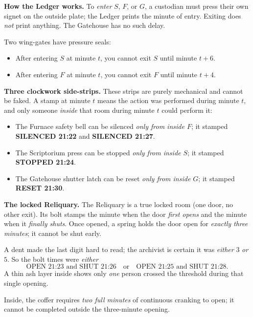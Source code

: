 \medskip

\noindent\textbf{How the Ledger works.}
To \emph{enter} \(S\), \(F\), or \(G\), a custodian must press their own signet on the outside plate; the Ledger prints the minute of entry.
Exiting does \emph{not} print anything. The Gatehouse has no such delay.

Two wing-gates have pressure seals:
\begin{itemize}
\item After entering \(S\) at minute \(t\), you cannot exit \(S\) until minute \(t+6\).
\item After entering \(F\) at minute \(t\), you cannot exit \(F\) until minute \(t+4\).
\end{itemize}


\noindent\textbf{Three clockwork side-strips.}
These strips are purely mechanical and cannot be faked. A stamp at minute \(t\) means the action was performed during minute \(t\), and only someone \emph{inside} that room during minute \(t\) could perform it:
\begin{itemize}
\item The Furnace safety bell can be silenced \emph{only from inside \(F\)}; it stamped \textbf{SILENCED 21:22} and \textbf{SILENCED 21:27}.
\item The Scriptorium press can be stopped \emph{only from inside \(S\)}; it stamped \textbf{STOPPED 21:24}.
\item The Gatehouse shutter latch can be reset \emph{only from inside \(G\)}; it stamped \textbf{RESET 21:30}.
\end{itemize}

\medskip

\noindent\textbf{The locked Reliquary.}
The Reliquary is a true locked room (one door, no other exit). Its bolt stamps the minute when the door \emph{first opens} and the minute when it \emph{finally shuts}.
Once opened, a spring holds the door open for \emph{exactly three minutes}; it cannot be shut early.

A dent made the last digit hard to read; the archivist is certain it was \emph{either} \(3\) \emph{or} \(5\).
So the bolt times were \emph{either}
\[
\text{OPEN 21:23 and SHUT 21:26}
\quad\text{or}\quad
\text{OPEN 21:25 and SHUT 21:28}.
\]
A thin ash layer inside shows only \emph{one} person crossed the threshold during that single opening.

Inside, the coffer requires \emph{two full minutes} of continuous cranking to open; it cannot be completed outside the three-minute opening.

